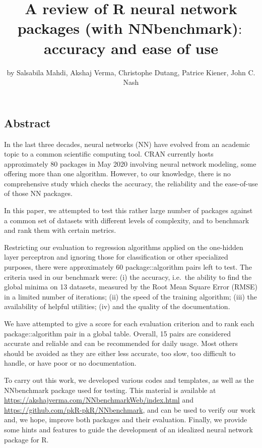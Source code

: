 \title{A review of R neural network packages (with NNbenchmark)\(:\) accuracy
and ease of use}
\author{by Salsabila Mahdi, Akshaj Verma, Christophe Dutang, Patrice Kiener, John C. Nash}

\maketitle


\hypertarget{abstract}{%
\subsection{Abstract}\label{abstract}}

In the last three decades, neural networks (NN) have evolved from an
academic topic to a common scientific computing tool. CRAN currently
hosts approximately 80 packages in May 2020 involving neural network
modeling, some offering more than one algorithm. However, to our
knowledge, there is no comprehensive study which checks the accuracy,
the reliability and the ease-of-use of those NN packages.

In this paper, we attempted to test this rather large number of packages
against a common set of datasets with different levels of complexity,
and to benchmark and rank them with certain metrics.

Restricting our evaluation to regression algorithms applied on the
one-hidden layer perceptron and ignoring those for classification or
other specialized purposes, there were approximately 60
package::algorithm pairs left to test. The criteria used in our
benchmark were: (i) the accuracy, i.e.~the ability to find the global
minima on 13 datasets, measured by the Root Mean Square Error (RMSE) in
a limited number of iterations; (ii) the speed of the training
algorithm; (iii) the availability of helpful utilities; (iv) and the
quality of the documentation.

We have attempted to give a score for each evaluation criterion and to
rank each package::algorithm pair in a global table. Overall, 15 pairs
are considered accurate and reliable and can be recommended for daily
usage. Most others should be avoided as they are either less accurate,
too slow, too difficult to handle, or have poor or no documentation.

To carry out this work, we developed various codes and templates, as
well as the NNbenchmark package used for testing. This material is
available at \url{https://akshajverma.com/NNbenchmarkWeb/index.html} and
\url{https://github.com/pkR-pkR/NNbenchmark}, and can be used to verify
our work and, we hope, improve both packages and their evaluation.
Finally, we provide some hints and features to guide the development of
an idealized neural network package for R.

